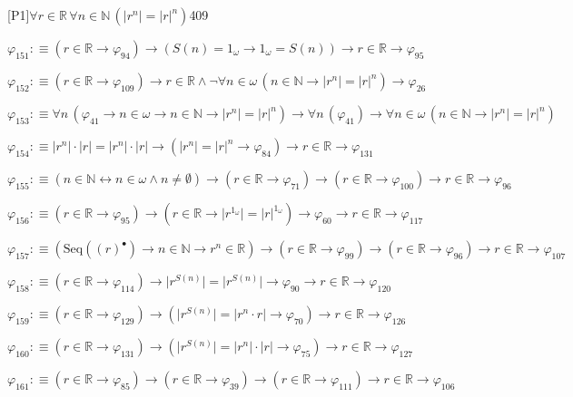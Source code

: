 \begin{fullproof}{[P1]}{$\forall r \in \mathbb{R}\,\forall n \in \mathbb{N}\,(\lvert {{r}^{n}} \rvert = {{\lvert r \rvert}^{n}})$}{409}
\begin{abbrevlist}
\item $\varphi_{151} :\equiv (r \in \mathbb{R} \to \varphi_{94}) \to (S(n) = 1_{\omega} \to 1_{\omega} = S(n)) \to r \in \mathbb{R} \to \varphi_{95}$
\item $\varphi_{152} :\equiv (r \in \mathbb{R} \to \varphi_{109}) \to r \in \mathbb{R} \land \neg \forall n \in \omega\,(n \in \mathbb{N} \to \lvert {{r}^{n}} \rvert = {{\lvert r \rvert}^{n}}) \to \varphi_{26}$
\item $\varphi_{153} :\equiv \forall n\,(\varphi_{41} \to n \in \omega \to n \in \mathbb{N} \to \lvert {{r}^{n}} \rvert = {{\lvert r \rvert}^{n}}) \to \forall n\,(\varphi_{41}) \to \forall n \in \omega\,(n \in \mathbb{N} \to \lvert {{r}^{n}} \rvert = {{\lvert r \rvert}^{n}})$
\item $\varphi_{154} :\equiv \lvert {{r}^{n}} \rvert \cdot \lvert r \rvert = \lvert {{r}^{n}} \rvert \cdot \lvert r \rvert \to (\lvert {{r}^{n}} \rvert = {{\lvert r \rvert}^{n}} \to \varphi_{84}) \to r \in \mathbb{R} \to \varphi_{131}$
\item $\varphi_{155} :\equiv (n \in \mathbb{N} \leftrightarrow n \in \omega \land n \neq \emptyset) \to (r \in \mathbb{R} \to \varphi_{71}) \to (r \in \mathbb{R} \to \varphi_{100}) \to r \in \mathbb{R} \to \varphi_{96}$
\item $\varphi_{156} :\equiv (r \in \mathbb{R} \to \varphi_{95}) \to (r \in \mathbb{R} \to \lvert {{r}^{1_{\omega}}} \rvert = {{\lvert r \rvert}^{1_{\omega}}}) \to \varphi_{60} \to r \in \mathbb{R} \to \varphi_{117}$
\item $\varphi_{157} :\equiv (\mathrm{Seq}({(r)^{\bullet}}) \to n \in \mathbb{N} \to {{r}^{n}} \in \mathbb{R}) \to (r \in \mathbb{R} \to \varphi_{99}) \to (r \in \mathbb{R} \to \varphi_{96}) \to r \in \mathbb{R} \to \varphi_{107}$
\item $\varphi_{158} :\equiv (r \in \mathbb{R} \to \varphi_{114}) \to \lvert {{r}^{S(n)}} \rvert = \lvert {{r}^{S(n)}} \rvert \to \varphi_{90} \to r \in \mathbb{R} \to \varphi_{120}$
\item $\varphi_{159} :\equiv (r \in \mathbb{R} \to \varphi_{129}) \to (\lvert {{r}^{S(n)}} \rvert = \lvert {{r}^{n}} \cdot r \rvert \to \varphi_{70}) \to r \in \mathbb{R} \to \varphi_{126}$
\item $\varphi_{160} :\equiv (r \in \mathbb{R} \to \varphi_{131}) \to (\lvert {{r}^{S(n)}} \rvert = \lvert {{r}^{n}} \rvert \cdot \lvert r \rvert \to \varphi_{75}) \to r \in \mathbb{R} \to \varphi_{127}$
\item $\varphi_{161} :\equiv (r \in \mathbb{R} \to \varphi_{85}) \to (r \in \mathbb{R} \to \varphi_{39}) \to (r \in \mathbb{R} \to \varphi_{111}) \to r \in \mathbb{R} \to \varphi_{106}$

\end{abbrevlist}
\end{fullproof}
